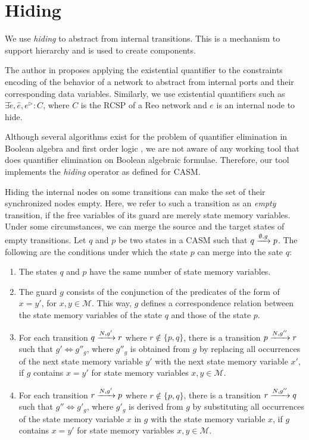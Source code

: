 \section{Hiding}
\label{sec:hiding}
We use \emph{hiding} to abstract from internal transitions. This is a mechanism to support hierarchy and is used to create components. 

The author in \cite{JoseThesis} proposes applying the existential quantifier to the constraints encoding of the behavior of a network to abstract from internal ports and their corresponding data variables. Similarly, we use existential quantifiers such as $\exists \tilde{e}, \hat{e}, {e}^\triangleright:C$, where $C$ is the RCSP of a Reo network and $e$ is an internal node to hide.

Although several algorithms exist for the problem of quantifier elimination in Boolean algebra and first order logic \cite{quantifiedbool} \cite{ayari2002qubos} \cite{reduce}, we are not aware of any working tool that does quantifier elimination on Boolean algebraic formulae. Therefore, our tool implements the \emph{hiding} operator as defined for CASM.

Hiding the internal nodes on some transitions can make the set of their synchronized nodes empty. Here, we refer to such a transition as an \emph{empty} transition, if the free variables of its guard are merely state memory variables. Under some circumstances, we can merge the source and the target states of empty transitions. Let $q$ and $p$ be two states in a CASM such that $q\xrightarrow{\emptyset, g}p$. The following are the conditions under which the state $p$ can merge into the sate $q$:
\begin{enumerate}
 \item The states $q$ and $p$ have the same number of state memory variables.
 \item The guard $g$ consists of the conjunction of the predicates of the form of $x = y'$, for $x, y \in \mathcal{M}$. This way, $g$ defines a correspondence relation between the state memory variables of the state $q$ and those of the state $p$. %
 \item For each transition $q\xrightarrow{N, g'}r$ where $r \notin \{p,q\}$, there is a transition $p\xrightarrow{N, g''}r$ such that $g' \Leftrightarrow g''_g$, where $g''_g$ is obtained from $g$ by replacing all occurrences of the next state memory variable $y'$ with the next state memory variable $x'$, if $g$ contains $x=y'$ for state memory variables $x, y \in \mathcal{M}$.
 \item For each transition $r\xrightarrow{N, g'}p$ where $r \notin \{p,q\}$, there is a transition $r\xrightarrow{N, g''}q$ such that $g'' \Leftrightarrow g'_g$, where $g'_g$ is derived from $g$ by substituting all occurrences of the state memory variable $x$ in $g$ with the state memory variable $x$, if $g$ contains $x=y'$ for state memory variables $x, y \in \mathcal{M}$.
\end{enumerate}

